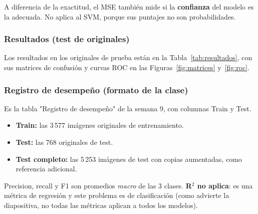 A diferencia de la exactitud, el MSE también mide si la \textbf{confianza} del modelo es la adecuada. No aplica al SVM, porque sus puntajes no son probabilidades.

\subsubsection{Resultados (test de originales)}
\label{mm:4.3}
Los resultados en los originales de prueba están en la Tabla~\ref{tab:resultados}, con sus matrices de confusión y curvas ROC en las Figuras~\ref{fig:matrices} y~\ref{fig:roc}.

\subsubsection{Registro de desempeño (formato de la clase)}
\label{mm:4.4}

Es la tabla "Registro de desempeño" de la semana 9, con columnas Train y Test.
\begin{itemize}
  \item \textbf{Train:} las 3\,577 imágenes originales de entrenamiento.
  \item \textbf{Test:} las 768 originales de test.
  \item \textbf{Test completo:} las 5\,253 imágenes de test con copias aumentadas, como referencia adicional.
\end{itemize}

Precision, recall y F1 son promedios \emph{macro} de las 3 clases. \textbf{R$^2$ no aplica}: es una métrica de regresión y este problema es de clasificación (como advierte la diapositiva, no todas las métricas aplican a todos los modelos).

